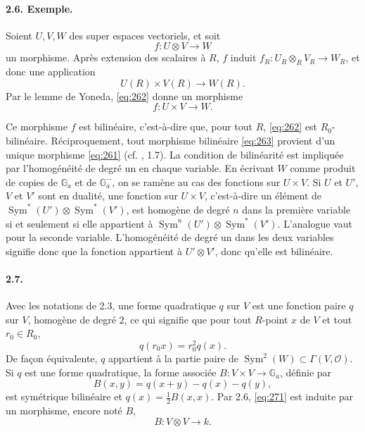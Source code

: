 \documentclass[11pt]{article}
\newcommand{\Sym}{\operatorname{Sym}}
\newcommand{\Ga}{\mathbb G_a}
\newcommand{\calO}{\mathcal O}
\begin{document}
\paragraph{2.6. Exemple.}
Soient $U,V,W$ des super espaces vectoriels, et soit
\begin{equation}
\label{eq:261}
f:U\otimes V\longrightarrow W
\end{equation}
un morphisme. Après extension des scalaires à $R$, $f$ induit $f_R:U_R\otimes_RV_R\to W_R$, et donc une application
\begin{equation}
\label{eq:262}
U(R)\times V(R)\longrightarrow W(R).
\end{equation}
Par le lemme de Yoneda, \eqref{eq:262} donne un morphisme
\begin{equation}
\label{eq:263}
f:U\times V\longrightarrow W.
\end{equation}

Ce morphisme $f$ est bilinéaire, c'est-à-dire que, pour tout $R$, \eqref{eq:262} est $R_0$-bilinéaire. Réciproquement, tout morphisme bilinéaire \eqref{eq:263} provient d'un unique morphisme \eqref{eq:261} (cf. \cite{DM99}, 1.7). La condition de bilinéarité est impliquée par l'homogénéité de degré un en chaque variable. En écrivant $W$ comme produit de copies de $\Ga$ et de $\Ga^-$, on se ramène au cas des fonctions sur $U\times V$. Si $U$ et $U'$, $V$ et $V'$ sont en dualité, une fonction sur $U\times V$, c'est-à-dire un élément de $\Sym^*(U')\otimes\Sym^*(V')$, est homogène de degré $n$ dans la première variable si et seulement si elle appartient à $\Sym^n(U')\otimes\Sym^*(V')$. L'analogue vaut pour la seconde variable. L'homogénéité de degré un dans les deux variables signifie donc que la fonction appartient à $U'\otimes V'$, donc qu'elle est bilinéaire.

\paragraph{2.7.}
Avec les notations de 2.3, une forme quadratique $q$ sur $V$ est une fonction paire $q$ sur $V$, homogène de degré $2$, ce qui signifie que pour tout $R$-point $x$ de $V$ et tout $r_0\in R_0$,
\[
q(r_0x)=r_0^2q(x).
\]
De façon équivalente, $q$ appartient à la partie paire de $\Sym^2(W)\subset\Gamma(V,\calO)$. Si $q$ est une forme quadratique, la forme associée $B:V\times V\to\Ga$, définie par
\begin{equation}
\label{eq:271}
B(x,y)=q(x+y)-q(x)-q(y),
\end{equation}
est symétrique bilinéaire et $q(x)=\frac12B(x,x)$. Par 2.6, \eqref{eq:271} est induite par un morphisme, encore noté $B$,
\begin{equation}
\label{eq:272}
B:V\otimes V\longrightarrow k.
\end{equation}
\end{document}
